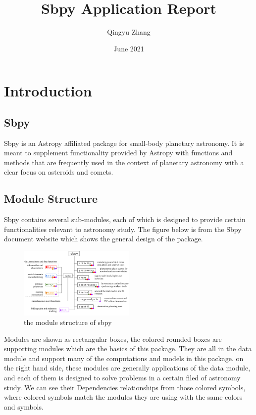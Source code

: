 \documentclass{report}
\begin{document}
\title{Sbpy Application Report}
\author{Qingyu Zhang}
\date{June 2021}
\maketitle

\tableofcontents


\chapter{Introduction}

\section{Sbpy}

Sbpy is an Astropy affiliated package for small-body planetary astronomy. It is meant to supplement functionality provided by Astropy with functions and methods that are frequently used in the context of planetary astronomy with a clear focus on asteroids and comets\cite{Mommert2019}.

\section{Module Structure}
Sbpy contains several sub-modules, each of which is designed to provide certain functionalities relevant to astronomy study. The figure below is from the Sbpy document website which shows the general design of the package.

\begin{figure}[htb]
    \centering
    \includegraphics[width=0.5\textwidth]{structure}
    \caption{the module structure of sbpy}
    \label{fig:structure}
\end{figure}

Modules are shown as rectangular boxes, the colored rounded boxes are supporting modules which are the basics of this package. They are all in the data module and support many of the computations and models in this package. on the right hand side, these modules are generally applications of the data module, and each of them is designed to solve problems in a certain filed of astronomy study. We can see their Dependencies relationships from those colored symbols, where colored symbols match the modules they are using with the same colors and symbols.
\end{document}
